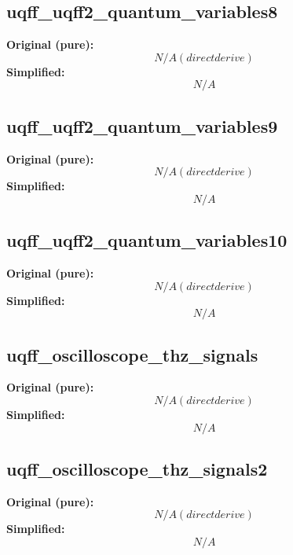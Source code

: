 \subsection{uqff_uqff2_quantum_variables8}
\textbf{Original (pure):}
\begin{equation}
N/A (direct derive)
\end{equation}
\textbf{Simplified:}
\begin{equation}
N/A
\end{equation}

\subsection{uqff_uqff2_quantum_variables9}
\textbf{Original (pure):}
\begin{equation}
N/A (direct derive)
\end{equation}
\textbf{Simplified:}
\begin{equation}
N/A
\end{equation}

\subsection{uqff_uqff2_quantum_variables10}
\textbf{Original (pure):}
\begin{equation}
N/A (direct derive)
\end{equation}
\textbf{Simplified:}
\begin{equation}
N/A
\end{equation}

\subsection{uqff_oscilloscope_thz_signals}
\textbf{Original (pure):}
\begin{equation}
N/A (direct derive)
\end{equation}
\textbf{Simplified:}
\begin{equation}
N/A
\end{equation}

\subsection{uqff_oscilloscope_thz_signals2}
\textbf{Original (pure):}
\begin{equation}
N/A (direct derive)
\end{equation}
\textbf{Simplified:}
\begin{equation}
N/A
\end{equation}

